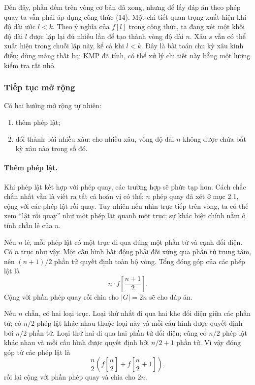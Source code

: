 \documentclass[11pt]{article}
\begin{document}
Đến đây, phần đếm trên vòng cơ bản đã xong, nhưng để lấy đáp án theo phép quay
ta vẫn phải áp dụng công thức (14). Một chi tiết quan trọng xuất hiện khi độ
dài ước \(l<k\). Theo ý nghĩa của \(f[l]\) trong công thức, ta đang xét một
khối độ dài \(l\) được lặp lại đủ nhiều lần để tạo thành vòng độ dài \(n\).
Xâu \(s\) vẫn có thể xuất hiện trong chuỗi lặp này, kể cả khi \(l<k\). Đây là
bài toán chu kỳ xâu kinh điển; dùng mảng thất bại KMP đã tính, có thể xử lý
chi tiết này bằng một lượng kiểm tra rất nhỏ.

\subsubsection{Tiếp tục mở rộng}

Có hai hướng mở rộng tự nhiên:
\begin{enumerate}
  \item thêm phép lật;
  \item đổi thành bài nhiều xâu: cho nhiều xâu, vòng độ dài \(n\) không được
  chứa bất kỳ xâu nào trong số đó.
\end{enumerate}

\paragraph{Thêm phép lật.}
Khi phép lật kết hợp với phép quay, các trường hợp sẽ phức tạp hơn. Cách chắc
chắn nhất vẫn là viết ra tất cả hoán vị có thể: \(n\) phép quay đã xét ở mục
2.1, cộng với các phép lật rồi quay. Tuy nhiên nếu nhìn trực tiếp trên vòng,
ta có thể xem ``lật rồi quay'' như một phép lật quanh một trục; sự khác biệt
chính nằm ở tính chẵn lẻ của \(n\).

Nếu \(n\) lẻ, mỗi phép lật có một trục đi qua đúng một phần tử và cạnh đối
diện. Có \(n\) trục như vậy. Một cấu hình bất động phải đối xứng qua phần tử
trung tâm, nên \((n+1)/2\) phần tử quyết định toàn bộ vòng. Tổng đóng góp của
các phép lật là
\[
  n\cdot f\left[\frac{n+1}{2}\right].
\]
Cộng với phần phép quay rồi chia cho \(|G|=2n\) sẽ cho đáp án.

Nếu \(n\) chẵn, có hai loại trục. Loại thứ nhất đi qua hai khe đối diện giữa
các phần tử; có \(n/2\) phép lật khác nhau thuộc loại này và mỗi cấu hình được
quyết định bởi \(n/2\) phần tử. Loại thứ hai đi qua hai phần tử đối diện; cũng
có \(n/2\) phép lật khác nhau và mỗi cấu hình được quyết định bởi \(n/2+1\)
phần tử. Vì vậy đóng góp từ các phép lật là
\[
  \frac{n}{2}\left(f\left[\frac{n}{2}\right]+
  f\left[\frac{n}{2}+1\right]\right),
\]
rồi lại cộng với phần phép quay và chia cho \(2n\).
\end{document}
